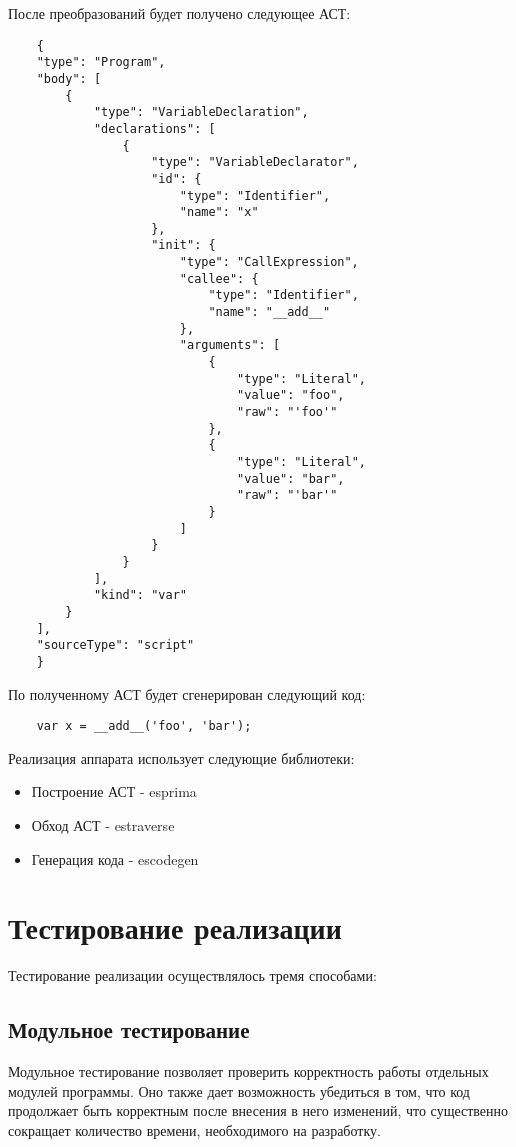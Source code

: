 После преобразований будет получено следующее АСТ:

\bigskip
\begin{lstlisting}
	{
    "type": "Program",
    "body": [
        {
            "type": "VariableDeclaration",
            "declarations": [
                {
                    "type": "VariableDeclarator",
                    "id": {
                        "type": "Identifier",
                        "name": "x"
                    },
                    "init": {
                        "type": "CallExpression",
                        "callee": {
                            "type": "Identifier",
                            "name": "__add__"
                        },
                        "arguments": [
                            {
                                "type": "Literal",
                                "value": "foo",
                                "raw": "'foo'"
                            },
                            {
                                "type": "Literal",
                                "value": "bar",
                                "raw": "'bar'"
                            }
                        ]
                    }
                }
            ],
            "kind": "var"
        }
    ],
    "sourceType": "script"
	}
\end{lstlisting}


По полученному АСТ будет сгенерирован следующий код:

\bigskip
\begin{lstlisting}
	var x = __add__('foo', 'bar');
\end{lstlisting}


Реализация аппарата использует следующие библиотеки:

\begin{itemize}
	\item Построение АСТ - esprima \cite{esprima}
	\item Обход АСТ - estraverse \cite{estraverse}
	\item Генерация кода -  escodegen \cite{escodegen}
\end{itemize}


\section{Тестирование реализации}
\label{tainting}
Тестирование реализации осуществлялось тремя способами:

\subsection{Модульное тестирование} 
	Модульное тестирование позволяет проверить корректность работы отдельных модулей программы. Оно также дает возможность убедиться в том, что код продолжает быть корректным после внесения в него изменений, что существенно сокращает количество времени, необходимого на разработку.


